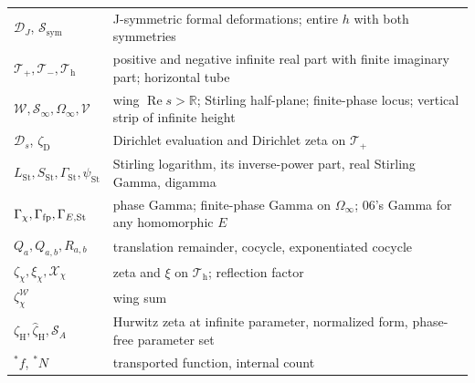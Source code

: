 \documentclass[11pt,a4paper]{article}
\numberwithin{equation}{section}
\theoremstyle{definition}
\theoremstyle{remark}
\newcommand{\R}{\mathbb R}
\renewcommand{\Re}{\operatorname{Re}}
\newcommand{\LSt}{L_{\mathrm{St}}}
\newcommand{\GSt}{\Gamma_{\mathrm{St}}}
\newcommand{\SSt}{S_{\mathrm{St}}}
\newcommand{\psiSt}{\psi_{\mathrm{St}}}
\newcommand{\zD}{\zeta_{\mathrm D}}
\newcommand{\zH}{\zeta_{\mathrm H}}
\newcommand{\zHh}{\widehat\zeta_{\mathrm H}}
\newcommand{\DD}{\mathcal D}
\newcommand{\FE}{\mathcal X}
\newcommand{\Tp}{\mathcal T_{+}}
\newcommand{\Tm}{\mathcal T_{-}}
\newcommand{\Th}{\mathcal T_{\mathrm h}}
\newcommand{\Wing}{\mathcal W}
\newcommand{\Sinf}{\mathcal S_{\infty}}
\newcommand{\Om}{\Omega_{\infty}}
\newcommand{\Vs}{\mathcal V}
\newcommand{\DJs}{\mathcal D_{J}}
\newcommand{\Ssym}{\mathcal S_{\mathrm{sym}}}
\newcommand{\SA}{\mathcal S_{A}}
\begin{document}
\begin{center}
\begin{longtable}{@{}P{0.22\textwidth}P{0.70\textwidth}@{}}
$\DJs$, $\Ssym$ & J-symmetric formal deformations; entire $h$ with both symmetries\\
$\Tp,\Tm,\Th$ & positive and negative infinite real part with finite imaginary part; horizontal tube\\
$\Wing,\Sinf,\Om,\Vs$ & wing $\Re s>\R$; Stirling half-plane; finite-phase locus; vertical strip of infinite height\\
$\DD_s$, $\zD$ & Dirichlet evaluation and Dirichlet zeta on $\Tp$\\
$\LSt,\SSt,\GSt,\psiSt$ & Stirling logarithm, its inverse-power part, real Stirling Gamma, digamma\\
$\Gamma_\chi,\Gamma_{\rm fp},\Gamma_{E,\rm St}$ & phase Gamma; finite-phase Gamma on $\Om$; 06's Gamma for any homomorphic $E$\\
$Q_a,Q_{a,b},R_{a,b}$ & translation remainder, cocycle, exponentiated cocycle\\
$\zeta_\chi,\xi_\chi,\FE_\chi$ & zeta and $\xi$ on $\Th$; reflection factor\\
$\zeta^\Wing_\chi$ & wing sum\\
$\zH,\zHh,\SA$ & Hurwitz zeta at infinite parameter, normalized form, phase-free parameter set\\
${}^*f$, ${}^*N$ & transported function, internal count\\
\bottomrule
\end{longtable}
\addtocounter{table}{-1}
\end{center}
\end{document}
